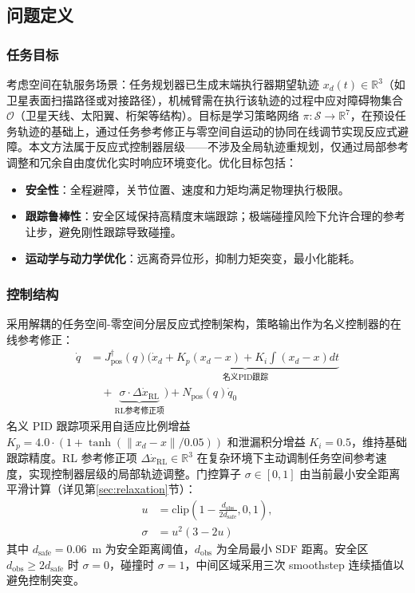 \documentclass[10pt,conference]{IEEEtran}
\begin{document}
\subsection{问题定义}
\label{sec:problem_def}

\subsubsection{任务目标}
考虑空间在轨服务场景：任务规划器已生成末端执行器期望轨迹 $x_d(t) \in \mathbb{R}^3$（如卫星表面扫描路径或对接路径），机械臂需在执行该轨迹的过程中应对障碍物集合 $\mathcal{O}$（卫星天线、太阳翼、桁架等结构）。目标是学习策略网络 $\pi: \mathcal{S} \rightarrow \mathbb{R}^{7}$，在预设任务轨迹的基础上，通过任务参考修正与零空间自运动的协同在线调节实现反应式避障。本文方法属于反应式控制器层级——不涉及全局轨迹重规划，仅通过局部参考调整和冗余自由度优化实时响应环境变化。优化目标包括：
\begin{itemize}
\item \textbf{安全性}：全程避障，关节位置、速度和力矩均满足物理执行极限。
\item \textbf{跟踪鲁棒性}：安全区域保持高精度末端跟踪；极端碰撞风险下允许合理的参考让步，避免刚性跟踪导致碰撞。
\item \textbf{运动学与动力学优化}：远离奇异位形，抑制力矩突变，最小化能耗。
\end{itemize}

\subsubsection{控制结构}
采用解耦的任务空间-零空间分层反应式控制架构，策略输出作为名义控制器的在线参考修正：
\begin{equation}
\begin{aligned}
\dot{q} &= J_{\text{pos}}^\dagger(q) \bigl( \underbrace{\dot{x}_d + K_p(x_d - x) + K_i \int (x_d - x) dt}_{\text{名义PID跟踪}} \\
&\quad + \underbrace{\sigma \cdot \Delta \dot{x}_{\text{RL}}}_{\text{RL参考修正项}} \bigr) + N_{\text{pos}}(q)\dot{q}_0
\end{aligned}
\label{eq:control_structure}
\end{equation}
名义 PID 跟踪项采用自适应比例增益 $K_p = 4.0 \cdot (1 + \tanh(\|x_d - x\| / 0.05))$ 和泄漏积分增益 $K_i = 0.5$，维持基础跟踪精度。RL 参考修正项 $\Delta \dot{x}_{\text{RL}} \in \mathbb{R}^3$ 在复杂环境下主动调制任务空间参考速度，实现控制器层级的局部轨迹调整。门控算子 $\sigma \in [0,1]$ 由当前最小安全距离平滑计算（详见第\ref{sec:relaxation}节）：
\begin{equation}
\begin{aligned}
u &= \text{clip}\left(1-\frac{d_{\text{obs}}}{2d_{\text{safe}}},0,1\right), \\
\sigma &= u^2(3-2u)
\end{aligned}
\label{eq:gate_operator}
\end{equation}
其中 $d_{\text{safe}}=0.06$~m 为安全距离阈值，$d_{\text{obs}}$ 为全局最小 SDF 距离。安全区 $d_{\text{obs}}\geq2d_{\text{safe}}$ 时 $\sigma=0$，碰撞时 $\sigma=1$，中间区域采用三次 smoothstep 连续插值以避免控制突变。
\end{document}
